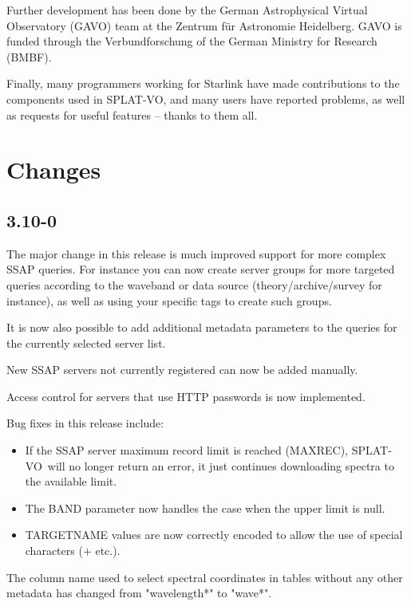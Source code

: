 \documentclass[twoside,11pt]{article}
\newcommand{\htmladdnormallink}[2]{#1}
\renewcommand{\_}{\texttt{\symbol{95}}}
\newcommand{\SPLAT}{\textsf{SPLAT-VO}}
\begin{document}
Further development has been done by the 
\htmladdnormallink{German Astrophysical Virtual Observatory  (GAVO)} {http://www.g-vo.org} team at the 
\htmladdnormallink{Zentrum f\"ur Astronomie Heidelberg} {http://www.zah.uni-heidelberg.de}. 
GAVO is funded through the Verbundforschung of the German Ministry for Research (BMBF).

Finally, many programmers working for Starlink have made contributions to the
components used in \SPLAT, and many users have reported problems, as well as
requests for useful features -- thanks to them all.

\section{Changes}

\subsection{3.10-0}

The major change in this release is much improved support for more complex
SSAP queries. For instance you can now create server groups for more targeted
queries according to the waveband or data source (theory/archive/survey for
instance), as well as using your specific tags to create such groups.

It is now also possible to add additional metadata parameters to the queries
for the currently selected server list.

New SSAP servers not currently registered can now be added  manually.

Access control for servers that use HTTP passwords is now implemented.

Bug fixes in this release include:
\begin{itemize}
\item If the SSAP server maximum record limit is reached (MAXREC),
\SPLAT\ will no longer return an error, it just continues downloading
spectra to the available limit.

\item The BAND parameter now handles the case when the upper limit is null.

\item TARGETNAME values are now correctly encoded to allow the use of special
characters ($+$ etc.).
\end{itemize}

The column name used to select spectral coordinates in tables without any
other metadata has changed from "wavelength*" to "wave*".
  
\end{document}
